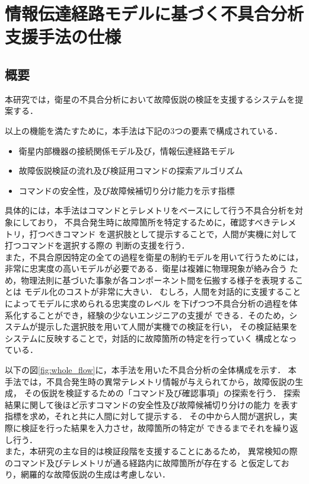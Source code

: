 \documentclass[11pt]{jsreport}
\begin{document}
\fi

\chapter{情報伝達経路モデルに基づく不具合分析支援手法の仕様}

\section{概要}
本研究では，衛星の不具合分析において故障仮説の検証を支援するシステムを提案する．

以上の機能を満たすために，本手法は下記の3つの要素で構成されている．
\begin{itemize}
   \item 衛星内部機器の接続関係モデル及び，情報伝達経路モデル
   \item 故障仮説検証の流れ及び検証用コマンドの探索アルゴリズム %
   \item コマンドの安全性，及び故障候補切り分け能力を示す指標
\end{itemize}

具体的には，本手法はコマンドとテレメトリをベースにして行う不具合分析を対象にしており，
不具合発生時に故障箇所を特定するために，確認すべきテレメトリ，打つべきコマンド
を選択肢として提示することで，人間が実機に対して打つコマンドを選択する際の
判断の支援を行う．\\
また，不具合原因特定の全ての過程を衛星の制約モデルを用いて行うためには，%
非常に忠実度の高いモデルが必要である．衛星は複雑に物理現象が絡み合う
ため，物理法則に基づいた事象が各コンポーネント間を伝搬する様子を表現することは
モデル化のコストが非常に大きい．
むしろ，人間を対話的に支援することによってモデルに求められる忠実度のレベル
を下げつつ不具合分析の過程を体系化することができ，経験の少ないエンジニアの支援が
できる．そのため，システムが提示した選択肢を用いて人間が実機での検証を行い，
その検証結果をシステムに反映することで，対話的に故障箇所の特定を行っていく
構成となっている．



以下の図\ref{fig:whole_flow}に，本手法を用いた不具合分析の全体構成を示す．
本手法では，不具合発生時の異常テレメトリ情報が与えられてから，故障仮説の生成，
その仮説を検証するための「コマンド及び確認事項」の探索を行う．
探索結果に関して後ほど示すコマンドの安全性及び故障候補切り分けの能力
を表す指標を求め，それと共に人間に対して提示する．
その中から人間が選択し，実際に検証を行った結果を入力させ，故障箇所の特定が
できるまでそれを繰り返し行う．\\
また，本研究の主な目的は検証段階を支援することにあるため，
異常検知の際のコマンド及びテレメトリが通る経路内に故障箇所が存在する
と仮定しており，網羅的な故障仮説の生成は考慮しない．
\end{document}
